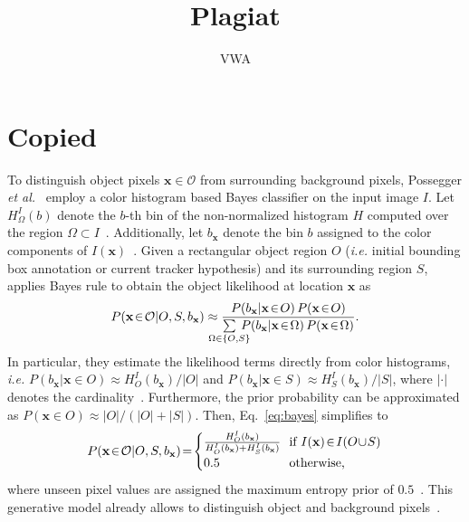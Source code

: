 \documentclass[a4paper,10pt]{article}
\title{Plagiat}
\author{VWA}
\newcommand{\ie}{\emph{i.e.} }
\renewcommand{\vec}[1]{\ensuremath{\mathbf{#1}}}
\begin{document}
\maketitle
\section*{Copied}
To distinguish object pixels $\vec{x}\in\mathcal{O}$ from surrounding background pixels, Possegger \emph{et al.}~\cite{possegger15} employ a color histogram based Bayes classifier on the input image $I$.
Let $H^I_\Omega(b)$ denote the $b$-th bin of the non-normalized histogram $H$ computed over the region $\Omega\subset I$~\cite{possegger15}.
Additionally, let $b_\vec{x}$ denote the bin $b$ assigned to the color components of $I(\vec{x})$~\cite{possegger15}.
Given a rectangular object region $O$ (\ie initial bounding box annotation or current tracker hypothesis) and its surrounding region $S$, \cite{possegger15} applies Bayes rule to obtain the object likelihood at location $\vec{x}$ as %
\begin{align}
  P\!\left(\vec{x}\!\in\!\mathcal{O}|O,S,b_\vec{x}\right) \approx \frac{P\!\left( b_\vec{x}|\vec{x}\!\in\!O\right)  P\!\left(\vec{x}\!\in\!O\right)}{\sum\limits_{\mathclap{\Omega\in\{O,S\}}}{\:P\!\left(b_\vec{x}|\vec{x}\!\in\!\Omega\right) P\!\left(\vec{x}\!\in\!\Omega\right)}}\label{eq:bayes}.
\end{align}
In particular, they estimate the likelihood terms directly from color histograms, \ie $P\!\left( b_\vec{x}|\vec{x}\!\in\!O\right) \approx H^I_O(b_\vec{x})/|O|$ and $P\!\left( b_\vec{x}|\vec{x}\!\in\!S\right) \approx H^I_S(b_\vec{x})/|S|$, where $|\cdot|$ denotes the cardinality~\cite{possegger15}.
Furthermore, the prior probability can be approximated as $P\!\left(\vec{x}\!\in\!O\right)\approx|O|/(|O|+|S|)$.
Then, Eq.~\eqref{eq:bayes} simplifies to
\begin{gather}
\begin{aligned}
  P\!\left(\vec{x}\!\in\!\mathcal{O}|O,S,b_\vec{x}\right)\!=\!\begin{cases}
                                                                            \frac{H^I_{O}(b_\vec{x})}{H^I_{O}(b_\vec{x}) + H^I_{S}(b_\vec{x})} & \!\!\text{if $I(\vec{x})\!\in\!I(O\!\cup\!S)$}\\
                                                                            0.5 & \!\!\text{otherwise,}
                                                                          \end{cases}\label{eq:om_surr}
\end{aligned}\raisetag{\baselineskip}
\end{gather}
where unseen pixel values are assigned the maximum entropy prior of $0.5$~\cite{possegger15}.
This generative model already allows to distinguish object and background pixels~\cite{possegger15}.
\end{document}
